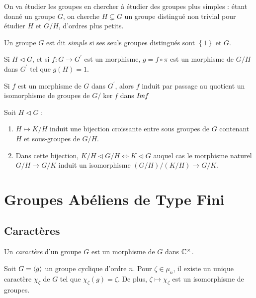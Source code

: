 \documentclass{cours}
\begin{document}
On va étudier les groupes en chercher à étudier des groupes plus simples : étant donné un groupe $G$, on cherche $H \subsetneq G$ un groupe distingué non trivial pour étudier $H$ et $G/H$, d'ordres plus petits. 
\begin{definition}
    Un groupe $G$ est dit \emph{simple} si ses seuls groupes distingués sont $\left\{1\right\}$ et $G$.
\end{definition}

\begin{theorem}\label{grpquotients}
    Si $H \lhd G$, et si $f : G \rightarrow G^{'}$ est un morphisme, $g = f \circ \pi$ est un morphisme de $G/H$ dans $G^{'}$ tel que $g(H) = {1}$.
\end{theorem}

\begin{theorem}
    Si $f$ est un morphisme de $G$ dans $G^{'}$, alors $f$ induit par passage au quotient un isomorphisme de groupes de $G/\ker f$ dans $\emph{Im} f$
\end{theorem}

\begin{proposition}
    Soit $H \lhd G$ : 
    \begin{enumerate}
        \item $H \mapsto K/H$ induit une bijection croissante entre sous groupes de $G$ contenant $H$ et sous-groupes de $G/H$.
        \item Dans cette bijection, $K/H \lhd G/H \Leftrightarrow K \lhd G$ auquel cas le morphisme naturel $G/H \rightarrow G/K$ induit un isomorphisme $\left(G/H\right)/\left(K/H\right) \rightarrow G/K$.
    \end{enumerate}
\end{proposition}

\newpage
\section{Groupes Abéliens de Type Fini}
\subsection{Caractères}
\begin{definition}
    Un \emph{caractère} d'un groupe $G$ est un morphisme de $G$ dans $\mathbb{C}^{\times}$.
\end{definition}

\begin{proposition}
    Soit $G = \left\langle g \right\rangle$ un groupe cyclique d'ordre $n$. Pour $\zeta \in \mu_{n}$, il existe un unique caractère $\chi_{\zeta}$ de $G$ tel que $\chi_{\zeta}(g) = \zeta$. De plus, $\zeta \mapsto \chi_{\zeta}$ est un isomorphisme de groupes. 
\end{proposition}
\end{document}
